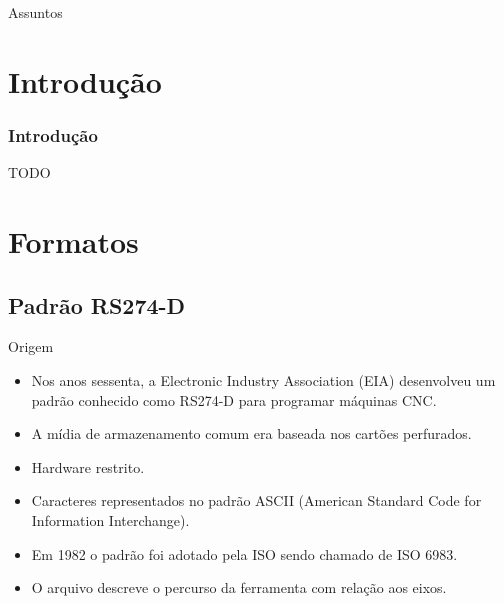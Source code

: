 \documentclass[aspectratio=169]{beamer}
\begin{document}
{%
\begin{frame}{Assuntos}
  \tableofcontents
\end{frame}


\section{Introdução}

\begin{frame}
  \frametitle{Introdução}

  TODO

\end{frame}

\section{Formatos}


\subsection{Padrão RS274-D}

\begin{frame}{Origem}
  \begin{itemize}
  \item {
    Nos anos sessenta, a Electronic Industry Association (EIA) desenvolveu um 
    padrão conhecido como RS274-D para programar máquinas CNC.
  }
  \item {
    A mídia de armazenamento comum era baseada nos cartões perfurados.
  }
  \item {
    Hardware restrito.
  }
  \item {
    Caracteres representados no padrão ASCII (American Standard Code for Information Interchange).
  }
  \item {
    Em 1982 o padrão foi adotado pela ISO sendo chamado de ISO 6983.
  }
  \item {
    O arquivo descreve o percurso da ferramenta com relação aos eixos.
  }
  \end{itemize}
\end{frame}

}
\end{document}
